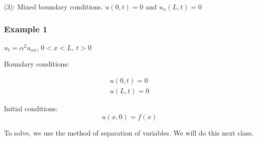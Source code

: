 \documentclass{article}
\begin{document}
(3): Mixed boundary conditions. $u(0,t) = 0$ and $u_x (L,t) = 0$

\subsubsection{Example 1}
\begin{center}
    $u_t = \alpha^2 u_{xx}$, $0 < x < L$, $t > 0$
\end{center}


Boundary conditions:

$$\begin{matrix} u(0,t) = 0 \\ u(L,t) = 0 \end{matrix}$$

Initial conditions: $$u(x,0) = f(x)$$

To solve, we use the method of separation of variables. We will do this next class. 
\end{document}
